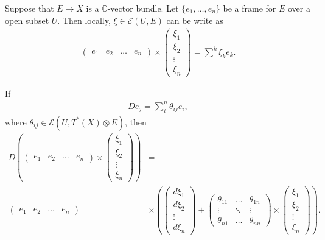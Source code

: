 \documentclass[a4paper,10pt]{amsart}
\newcommand{\C}{\mathbb C} %
\newcommand{\E}{\mathcal E}
\begin{document}
Suppose that $E \rightarrow X$ is a $\C$-vector bundle.
Let $\{e_1, \ldots, e_n \}$ be a frame for $E$ over a open
subset $U$. Then locally, $\xi \in \E(U, E)$ can be write as
\begin{align*}
   \begin{pmatrix}
       e_1 & e_2 & \ldots & e_n 
   \end{pmatrix} \times
   \begin{pmatrix}
       \xi_1\\
       \xi_2\\
       \vdots\\
       \xi_n
   \end{pmatrix} = \sum^{k}\xi_k e_k.
\end{align*}

If
\begin{align*}
    D e_{j} = \sum^{n}_{i} \theta_{ij}e_{i}, 
\end{align*}
where $\theta_{ij} \in \E(U, T^{*}(X)\otimes E)$,
then
\begin{align*}
    D(
    \begin{pmatrix}
       e_1 & e_2 & \ldots & e_n 
    \end{pmatrix} \times 
    \begin{pmatrix}
       \xi_1\\
       \xi_2\\
       \vdots\\
       \xi_n
   \end{pmatrix}) &= \\ 
    \begin{pmatrix}
       e_1 & e_2 & \ldots & e_n 
    \end{pmatrix} &\times \left (
    \begin{pmatrix}
       d\xi_1\\
       d\xi_2\\
       \vdots\\
       d\xi_n
   \end{pmatrix} + 
   \begin{pmatrix}
       \theta_{11} & \ldots & \theta_{1n}\\
       \vdots      & \ddots & \vdots \\
       \theta_{n1} & \ldots & \theta_{nn}
   \end{pmatrix} \times
    \begin{pmatrix}
       \xi_1\\
       \xi_2\\
       \vdots\\
       \xi_n
   \end{pmatrix} \right ).
\end{align*}
\end{document}
